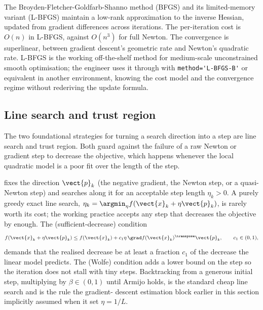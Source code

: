 The Broyden-Fletcher-Goldfarb-Shanno method (BFGS) and its
limited-memory variant (L-BFGS) maintain a low-rank approximation
to the inverse Hessian, updated from gradient differences across
iterations. The per-iteration cost is $O(n)$ in L-BFGS, against
$O(n^{3})$ for full Newton. The convergence is superlinear,
between gradient descent's geometric rate and Newton's quadratic
rate. L-BFGS is the working off-the-shelf method for medium-scale
unconstrained smooth optimisation; the engineer uses it through
 with \verb|method='L-BFGS-B'|
or equivalent in another environment, knowing the cost model and
the convergence regime without rederiving the update formula.

\subsection{Line search and trust region}

The two foundational strategies for turning a search direction
into a step are line search and trust region. Both guard against
the failure of a raw Newton or gradient step to decrease the
objective, which happens whenever the local quadratic model is a
poor fit over the length of the step.

 fixes the direction $\vect{p}_{k}$ (the
negative gradient, the Newton step, or a quasi-Newton step) and
searches along it for an acceptable step length $\eta_{k} > 0$. A
purely greedy exact line search, $\eta_{k} = \argmin_{\eta} f(
\vect{x}_{k} + \eta \vect{p}_{k})$, is rarely worth its cost; the
working practice accepts any step that decreases the objective by
enough. The  (sufficient-decrease) condition
\[
f(\vect{x}_{k} + \eta \vect{p}_{k}) \leq f(\vect{x}_{k}) + c_{1}
\eta \, \grad f(\vect{x}_{k})^{\transpose} \vect{p}_{k},
\qquad c_{1} \in (0, 1),
\]
demands that the realised decrease be at least a fraction $c_{1}$
of the decrease the linear model predicts. The 
(Wolfe) condition adds a lower bound on the step so the iteration
does not stall with tiny steps. Backtracking from a generous
initial step, multiplying by $\beta \in (0, 1)$ until Armijo holds,
is the standard cheap line search and is the rule the gradient-
descent estimation block earlier in this section implicitly
assumed when it set $\eta = 1/L$.

